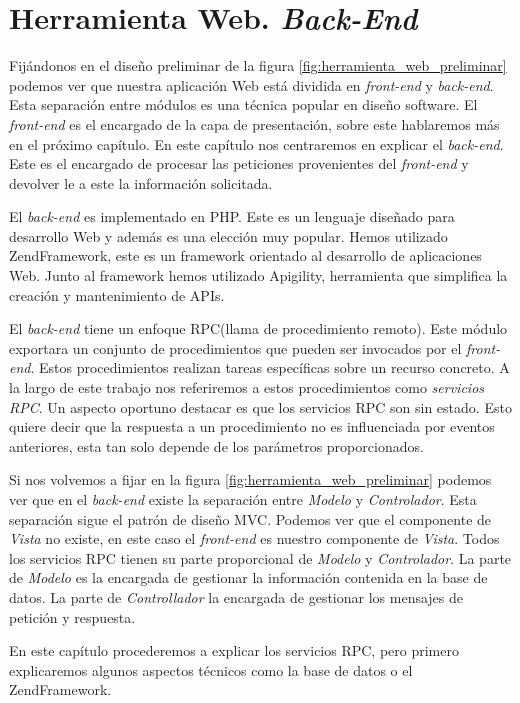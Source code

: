 \chapter{Herramienta Web. \emph{Back-End}}
\label{backend}

Fijándonos en el diseño preliminar de la figura \ref{fig:herramienta_web_preliminar} podemos ver que nuestra aplicación Web está dividida en
\emph{front-end} y \emph{back-end}. Esta separación entre módulos es una técnica popular en diseño software. El \emph{front-end} es el encargado de la
capa de presentación, sobre este hablaremos más en el próximo capítulo. En este capítulo nos centraremos en explicar el \emph{back-end}. Este es el
encargado de procesar las peticiones provenientes del \emph{front-end} y devolver le a este la información solicitada. 
\par
El \emph{back-end} es implementado en PHP\cite{PHP}. Este es un lenguaje diseñado para desarrollo Web y además es una elección muy popular. Hemos
utilizado ZendFramework\cite{ZF}, este es un framework orientado al desarrollo de aplicaciones Web. Junto al framework hemos utilizado
Apigility\cite{Apigility}, herramienta que simplifica la creación y mantenimiento de APIs.
\par
El \emph{back-end} tiene un enfoque RPC(llama de procedimiento remoto). Este módulo exportara un conjunto de procedimientos que pueden ser invocados
por el \emph{front-end}. Estos procedimientos realizan tareas específicas sobre un recurso concreto. A la largo de este trabajo nos referiremos a
estos procedimientos como \emph{servicios RPC}. Un aspecto oportuno destacar es que los servicios RPC son sin estado. Esto quiere decir que la
respuesta a un procedimiento no es influenciada por eventos anteriores, esta tan solo depende de los parámetros proporcionados.
\par
Si nos volvemos a fijar en la figura \ref{fig:herramienta_web_preliminar} podemos ver que en el \emph{back-end} existe la separación entre
\emph{Modelo} y \emph{Controlador}. Esta separación sigue el patrón de diseño MVC\cite{MVCWiki}. Podemos ver que el componente de \emph{Vista} no
existe, en este caso el \emph{front-end} es nuestro componente de \emph{Vista}. Todos los servicios RPC tienen su parte proporcional de \emph{Modelo}
y \emph{Controlador}. La parte de \emph{Modelo} es la encargada de gestionar la información contenida en la base de datos. La parte de
\emph{Controllador} la encargada de gestionar los mensajes de petición y respuesta.
\par
En este capítulo procederemos a explicar los servicios RPC, pero primero explicaremos algunos aspectos técnicos como la base de datos o el
ZendFramework.
